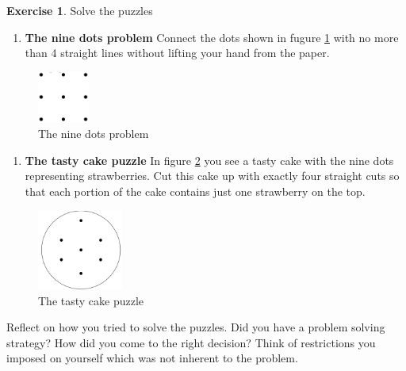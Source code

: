 \documentclass[
  12pt,
  oneside]{book}
\providecommand{\tightlist}{%
  \setlength{\itemsep}{0pt}\setlength{\parskip}{0pt}}
\theoremstyle{definition}
\theoremstyle{definition}
\theoremstyle{definition}
\newtheorem{exercise}{Exercise}[chapter]
\theoremstyle{definition}
\theoremstyle{remark}
\begin{document}
\begin{exercise}
\protect\hypertarget{exr:puzzle}{}\label{exr:puzzle}Solve the puzzles

\begin{enumerate}
\def\labelenumi{\alph{enumi})}
\tightlist
\item
  \textbf{The nine dots problem}
  Connect the dots shown in fugure \ref{fig:9dots} with no more than 4 straight lines without lifting your hand from the paper.
\end{enumerate}

\begin{figure}
\centering
\includegraphics[width=0.15\textwidth,height=\textheight]{fig/9dots.png}
\caption{\label{fig:9dots} The nine dots problem}
\end{figure}

\begin{enumerate}
\def\labelenumi{\alph{enumi})}
\setcounter{enumi}{1}
\tightlist
\item
  \textbf{The tasty cake puzzle} In figure \ref{fig:cake} you see a tasty cake with the nine dots representing strawberries. Cut this cake up with exactly four straight cuts so that each portion of the cake contains just one strawberry on the top.
\end{enumerate}

\begin{figure}
\centering
\includegraphics[width=0.25\textwidth,height=\textheight]{fig/cake.png}
\caption{\label{fig:cake} The tasty cake puzzle}
\end{figure}

Reflect on how you tried to solve the puzzles. Did you have a problem solving strategy? How did you come to the right decision? Think of restrictions you imposed on yourself which was not inherent to the problem.
\end{exercise}
\end{document}
